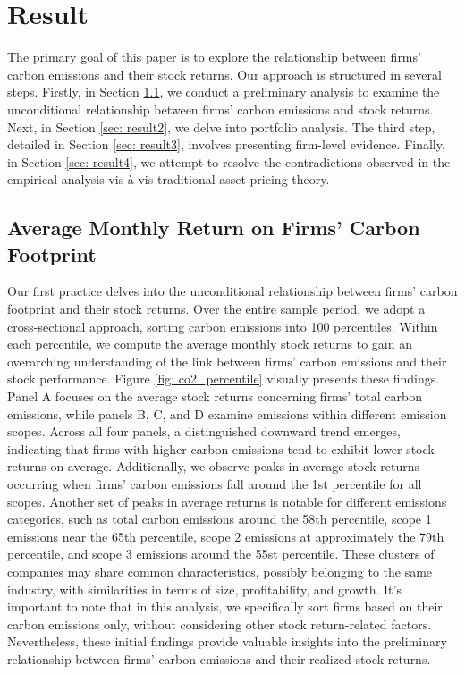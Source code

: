 \documentclass[12pt]{article}
\begin{document}
\section{Result} \label{sec: result}

The primary goal of this paper is to explore the relationship between firms' carbon emissions and their stock returns. Our approach is structured in several steps. Firstly, in Section \ref{sec: result1}, we conduct a preliminary analysis to examine the unconditional relationship between firms' carbon emissions and stock returns. Next, in Section \ref{sec: result2}, we delve into portfolio analysis. The third step, detailed in Section \ref{sec: result3}, involves presenting firm-level evidence. Finally, in Section \ref{sec: result4}, we attempt to resolve the contradictions observed in the empirical analysis vis-à-vis traditional asset pricing theory.

\subsection{Average Monthly Return on Firms' Carbon Footprint}
\label{sec: result1}
Our first practice delves into the unconditional relationship between firms' carbon footprint and their stock returns. Over the entire sample period, we adopt a cross-sectional approach, sorting carbon emissions into 100 percentiles. Within each percentile, we compute the average monthly stock returns to gain an overarching understanding of the link between firms' carbon emissions and their stock performance. Figure \ref{fig: co2_percentile} visually presents these findings. Panel A focuses on the average stock returns concerning firms' total carbon emissions, while panels B, C, and D examine emissions within different emission scopes. Across all four panels, a distinguished downward trend emerges, indicating that firms with higher carbon emissions tend to exhibit lower stock returns on average. Additionally, we observe peaks in average stock returns occurring when firms' carbon emissions fall around the 1st percentile for all scopes. Another set of peaks in average returns is notable for different emissions categories, such as total carbon emissions around the 58th percentile, scope 1 emissions near the 65th percentile, scope 2 emissions at approximately the 79th percentile, and scope 3 emissions around the 55st percentile. These clusters of companies may share common characteristics, possibly belonging to the same industry, with similarities in terms of size, profitability, and growth. It's important to note that in this analysis, we specifically sort firms based on their carbon emissions only, without considering other stock return-related factors. Nevertheless, these initial findings provide valuable insights into the preliminary relationship between firms' carbon emissions and their realized stock returns.
\end{document}
